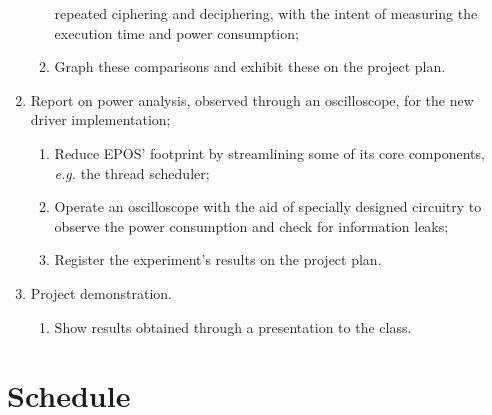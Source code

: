 \documentclass{../sftex/sftex}
\begin{document}
\begin{enumerate}
\begin{enumerate}
        repeated ciphering and deciphering, with the intent of measuring the
          execution time and power consumption;
    \item Graph these comparisons and exhibit these on the project plan.
  \end{enumerate}
  \item Report on power analysis, observed through an oscilloscope, for the new
    driver implementation;
  \begin{enumerate}
    \item Reduce EPOS' footprint by streamlining some of its core components,
        \emph{e.g.} the thread scheduler;
    \item Operate an oscilloscope with the aid of specially designed circuitry
        to observe the power consumption and check for information leaks;
    \item Register the experiment's results on the project plan.
  \end{enumerate}
  \item Project demonstration.
  \begin{enumerate}
    \item Show results obtained through a presentation to the class.
  \end{enumerate}
\end{enumerate}

\section{Schedule}
\end{document}
